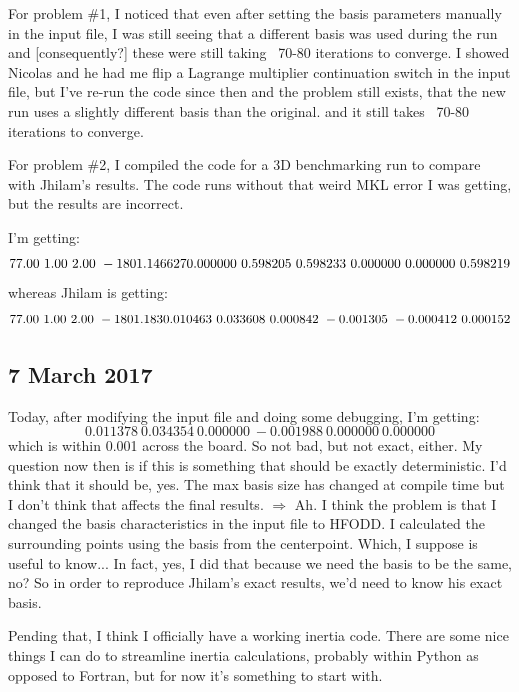\documentclass[]{report}
\begin{document}
For problem \#1, I noticed that even after setting the basis parameters manually in the input file, I was still seeing that a different basis was used during the run and [consequently?] these were still taking ~70-80 iterations to converge. I showed Nicolas and he had me flip a Lagrange multiplier continuation switch in the input file, but I've re-run the code since then and the problem still exists, that the new run uses a slightly different basis than the original. and it still takes ~70-80 iterations to converge.

For problem \#2, I compiled the code for a 3D benchmarking run to compare with Jhilam's results. The code runs without that weird MKL error I was getting, but the results are incorrect.

I'm getting:
\begin{equation}
   77.00\    1.00\    2.00\   -1801.146627 \\
       0.000000\    0.598205\    0.598233\    0.000000\    0.000000\    0.598219
\end{equation}
whereas Jhilam is getting:
\begin{equation}
   77.00\    1.00\    2.00\   -1801.183 \\
   0.010463\    0.033608\    0.000842\   -0.001305\   -0.000412\    0.000152
\end{equation}

\subsection*{7 March 2017}
Today, after modifying the input file and doing some debugging, I'm getting:
\begin{equation}
    0.011378\    0.034354\    0.000000\   -0.001988\    0.000000\    0.000000
\end{equation}
\noindent which is within 0.001 across the board. So not bad, but not exact, either. My question now then is if this is something that should be exactly deterministic. I'd think that it should be, yes. The max basis size has changed at compile time but I don't think that affects the final results. $\Rightarrow$ Ah. I think the problem is that I changed the basis characteristics in the input file to HFODD. I calculated the surrounding points using the basis from the centerpoint. Which, I suppose is useful to know... In fact, yes, I did that because we need the basis to be the same, no? So in order to reproduce Jhilam's exact results, we'd need to know his exact basis.

Pending that, I think I officially have a working inertia code. There are some nice things I can do to streamline inertia calculations, probably within Python as opposed to Fortran, but for now it's something to start with.
\end{document}
